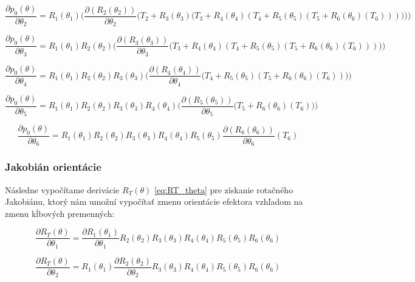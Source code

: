 \begin{equation}
\frac{\partial p_0(\theta)}{\partial \theta_2} = R_1(\theta_1)\Bigg(\frac{\partial(R_2(\theta_2))}{\partial \theta_2}\Big(T_2 + R_3(\theta_3)\big(T_3 + R_4(\theta_4)\left(T_4 + R_5(\theta_5)\left(T_5 + R_6(\theta_6)(T_6)\right)\right)\big)\Big)\Bigg)
\end{equation}

\begin{equation}
\frac{\partial p_0(\theta)}{\partial \theta_3} = R_1(\theta_1)R_2(\theta_2)\Bigg(\frac{\partial(R_3(\theta_3))}{\partial \theta_3}\Big(T_3 + R_4(\theta_4)\left(T_4 + R_5(\theta_5)\left(T_5 + R_6(\theta_6)(T_6)\right)\right)\Big)\Bigg)
\end{equation}

\begin{equation}
\frac{\partial p_0(\theta)}{\partial \theta_4} = R_1(\theta_1)R_2(\theta_2)R_3(\theta_3)\Bigg(\frac{\partial(R_4(\theta_4))}{\partial \theta_4}\Big(T_4 + R_5(\theta_5)\left(T_5 + R_6(\theta_6)(T_6)\right)\Big)\Bigg)
\end{equation}

\begin{equation}
\frac{\partial p_0(\theta)}{\partial \theta_5} = R_1(\theta_1)R_2(\theta_2)R_3(\theta_3)R_4(\theta_4)\Bigg(\frac{\partial(R_5(\theta_5))}{\partial \theta_5}\Big(T_5 + R_6(\theta_6)(T_6)\Big)\Bigg)
\end{equation}

\begin{equation}
\frac{\partial p_0(\theta)}{\partial \theta_6} = R_1(\theta_1)R_2(\theta_2)R_3(\theta_3)R_4(\theta_4)R_5(\theta_5)\frac{\partial(R_6(\theta_6))}{\partial \theta_6}(T_6)
\end{equation}

\subsubsection{Jakobián orientácie}
Následne vypočítame derivácie $R_T(\theta)$ \eqref{eq:RT_theta} pre získanie rotačného Jakobiánu, ktorý nám umožní vypočítať zmenu orientácie efektora vzhľadom na zmenu kĺbových premenných:

\begin{equation}
\frac{\partial R_T(\theta)}{\partial \theta_1} = \frac{\partial R_1(\theta_1)}{\partial \theta_1} R_2(\theta_2)R_3(\theta_3)R_4(\theta_4)R_5(\theta_5)R_6(\theta_6)
\end{equation}

\begin{equation}
\frac{\partial R_T(\theta)}{\partial \theta_2} = R_1(\theta_1) \frac{\partial R_2(\theta_2)}{\partial \theta_2} R_3(\theta_3)R_4(\theta_4)R_5(\theta_5)R_6(\theta_6)
\end{equation}

